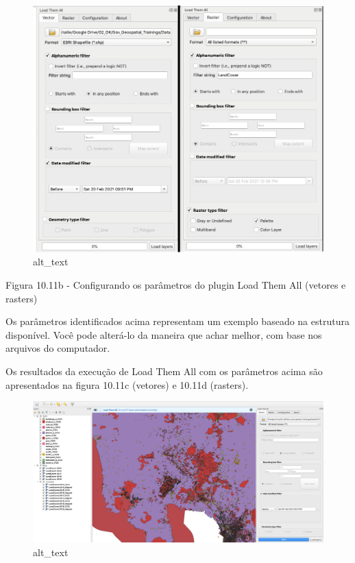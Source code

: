 \documentclass[
  portuguese,
]{krantz}
\begin{document}
\begin{figure}
\centering
\includegraphics{media/modulo10/fig1011_b.png}
\caption{alt\_text}
\end{figure}

Figura 10.11b - Configurando os parâmetros do plugin Load Them All (vetores e rasters)

Os parâmetros identificados acima representam um exemplo baseado na estrutura disponível. Você pode alterá-lo da maneira que achar melhor, com base nos arquivos do computador.

Os resultados da execução de Load Them All com os parâmetros acima são apresentados na figura 10.11c (vetores) e 10.11d (rasters).

\begin{figure}
\centering
\includegraphics{media/modulo10/fig1011_c.png}
\caption{alt\_text}
\end{figure}
\end{document}
